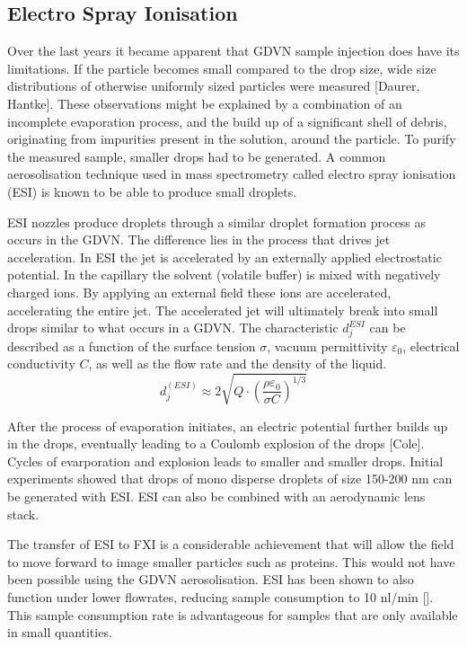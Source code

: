 \subsection{Electro Spray Ionisation}
Over the last years it became apparent that GDVN sample injection does have its limitations. If the particle becomes small compared to the drop size, wide size distributions of otherwise uniformly sized particles were measured [Daurer, Hantke]. These observations might be explained by a combination of an incomplete evaporation process, and the build up of a significant shell of debris, originating from impurities present in the solution, around the particle. To purify the measured sample, smaller drops had to be generated. A common aerosolisation technique used in mass spectrometry called electro spray ionisation (ESI) is known to be able to produce small droplets.

ESI nozzles produce droplets through a similar droplet formation process as occurs in the GDVN. The difference lies in the process that drives jet acceleration. In ESI the jet is accelerated by an externally applied electrostatic potential. In the capillary the solvent (volatile buffer) is mixed with negatively charged ions. By applying an external field these ions are accelerated, accelerating the entire jet. The accelerated jet will ultimately break into small drops similar to what occurs in a GDVN. The characteristic $d_j^{ESI}$ can be described as a function of the surface tension $\sigma$, vacuum permittivity $\varepsilon_0$, electrical conductivity $C$, as well as the flow rate and the density of the liquid.
\begin{equation}
d_j^{(ESI)} \approx 2 \sqrt{Q \cdot \left(\frac{\rho \varepsilon_0}{\sigma C}\right)^{1/3}}
\end{equation}

After the process of evaporation initiates, an electric potential further builds up in the drops, eventually leading to a Coulomb explosion of the drops [Cole]. Cycles of evarporation and explosion leads to smaller and smaller drops. Initial experiments showed that drops of mono disperse droplets of size 150-200 nm can be generated with ESI. ESI can also be combined with an aerodynamic lens stack. 

The transfer of ESI to FXI is a considerable achievement that will allow the field to move forward to image smaller particles such as proteins. This would not have been possible using the GDVN aerosolisation. ESI has been shown to also function under lower flowrates, reducing sample consumption to 10 nl/min []. This sample consumption rate is advantageous for samples that are only available in small quantities. 

